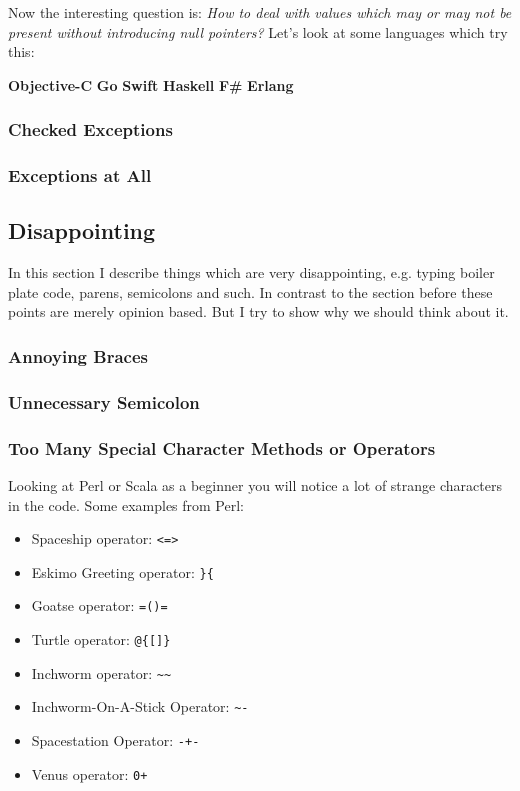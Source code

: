 \documentclass[a4paper,12pt]{article}
\begin{document}
Now the interesting question is: \textit{How to deal with values which may or may not be present without introducing null pointers?} Let's look at some languages which try this:

\textbf{Objective-C}
\textbf{Go}
\textbf{Swift}
\textbf{Haskell}
\textbf{F\#}
\textbf{Erlang}

\subsubsection{Checked Exceptions}


\subsubsection{Exceptions at All}


\subsection{Disappointing}

In this section I describe things which are very disappointing, e.g. typing boiler plate code, parens, semicolons and such. In contrast to the section before these points are merely opinion based. But I try to show why we should think about it.

\subsubsection{Annoying Braces}


\subsubsection{Unnecessary Semicolon}


\subsubsection{Too Many Special Character Methods or Operators}

Looking at Perl or Scala as a beginner you will notice a lot of strange characters in the code.
Some examples from Perl\cite{secret-perl-operators}:

\begin{itemize}
	\item Spaceship operator: \verb|<=>|
	\item Eskimo Greeting operator: \verb|}{|
	\item Goatse operator: \verb|=()=|
	\item Turtle operator: \verb|@{[]}|
	\item Inchworm operator: \verb|~~|
	\item Inchworm-On-A-Stick Operator: \verb|~-|
	\item Spacestation Operator: \verb|-+-|
	\item Venus operator: \verb|0+|
\end{itemize}
\end{document}
